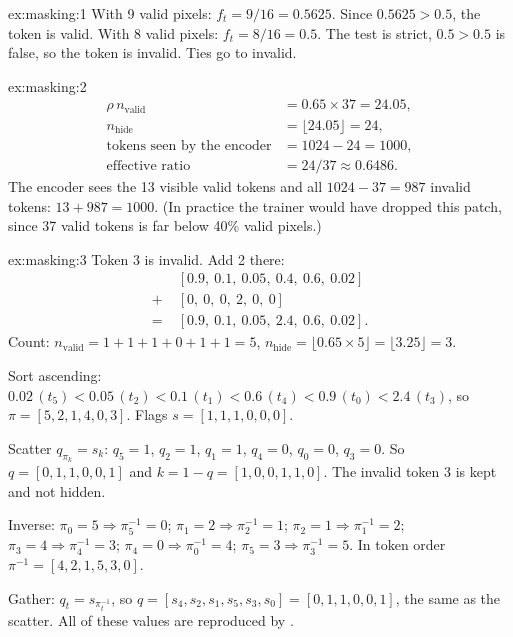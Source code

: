 
\begin{solution}{ex:masking:1}
With 9 valid pixels: $f_t = 9/16 = 0.5625$. Since $0.5625 > 0.5$, the token is valid. With 8 valid
pixels: $f_t = 8/16 = 0.5$. The test is strict, $0.5 > 0.5$ is false, so the token is invalid. Ties go
to invalid.
\end{solution}

\begin{solution}{ex:masking:2}
\begin{align*}
\rho\, n_{\text{valid}} &= 0.65 \times 37 = 24.05,\\
n_{\text{hide}} &= \lfloor 24.05 \rfloor = 24,\\
\text{tokens seen by the encoder} &= 1024 - 24 = 1000,\\
\text{effective ratio} &= 24 / 37 \approx 0.6486 .
\end{align*}
The encoder sees the 13 visible valid tokens and all $1024 - 37 = 987$ invalid tokens: $13 + 987 =
1000$. (In practice the trainer would have dropped this patch, since 37 valid tokens is far below 40\%
valid pixels.)
\end{solution}

\begin{solution}{ex:masking:3}
Token 3 is invalid. Add 2 there:
\begin{align*}
&[0.9,\ 0.1,\ 0.05,\ 0.4,\ 0.6,\ 0.02]\\
+\;&[0,\ 0,\ 0,\ 2,\ 0,\ 0]\\
=\;&[0.9,\ 0.1,\ 0.05,\ 2.4,\ 0.6,\ 0.02] .
\end{align*}
Count: $n_{\text{valid}} = 1+1+1+0+1+1 = 5$, $n_{\text{hide}} = \lfloor 0.65 \times 5 \rfloor = \lfloor
3.25 \rfloor = 3$.

Sort ascending: $0.02\,(t_5) < 0.05\,(t_2) < 0.1\,(t_1) < 0.6\,(t_4) < 0.9\,(t_0) < 2.4\,(t_3)$, so
$\pi = [5, 2, 1, 4, 0, 3]$. Flags $s = [1, 1, 1, 0, 0, 0]$.

Scatter $q_{\pi_k} = s_k$: $q_5 = 1$, $q_2 = 1$, $q_1 = 1$, $q_4 = 0$, $q_0 = 0$, $q_3 = 0$. So
$q = [0, 1, 1, 0, 0, 1]$ and $k = 1 - q = [1, 0, 0, 1, 1, 0]$. The invalid token 3 is kept and not
hidden.

Inverse: $\pi_0 = 5 \Rightarrow \pi^{-1}_5 = 0$; $\pi_1 = 2 \Rightarrow \pi^{-1}_2 = 1$; $\pi_2 = 1
\Rightarrow \pi^{-1}_1 = 2$; $\pi_3 = 4 \Rightarrow \pi^{-1}_4 = 3$; $\pi_4 = 0 \Rightarrow \pi^{-1}_0 =
4$; $\pi_5 = 3 \Rightarrow \pi^{-1}_3 = 5$. In token order $\pi^{-1} = [4, 2, 1, 5, 3, 0]$.

Gather: $q_t = s_{\pi^{-1}_t}$, so $q = [s_4, s_2, s_1, s_5, s_3, s_0] = [0, 1, 1, 0, 0, 1]$, the same
as the scatter. All of these values are reproduced by .
\end{solution}

